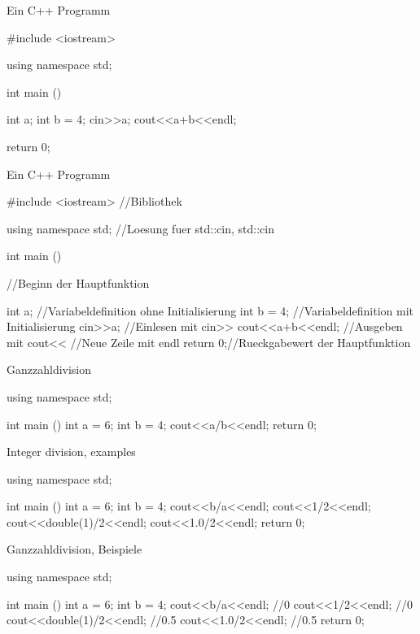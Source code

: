 \documentclass[handout,usenames,dvipsnames]{beamer}
\begin{document}
\begin{frame}[fragile]{Ein C++ Programm}
\begin{TFCpp}
#include <iostream>

using namespace std;

int main (){

	int a; 
	int b = 4;
	cin>>a;
	cout<<a+b<<endl;

	return 0;
}
\end{TFCpp}
\end{frame}

\begin{frame}[fragile]{Ein C++ Programm}
\begin{TFCpp}
#include <iostream> //Bibliothek

using namespace std; //Loesung fuer std::cin, std::cin

int main (){ //Beginn der Hauptfunktion

	int a; //Variabeldefinition ohne Initialisierung
	int b = 4; //Variabeldefinition mit Initialisierung
	cin>>a; //Einlesen mit cin>>
	cout<<a+b<<endl; //Ausgeben mit cout<<
	//Neue Zeile mit endl
	return 0;//Rueckgabewert der Hauptfunktion
}
\end{TFCpp}
\end{frame}

\begin{frame}[fragile]{Ganzzahldivision}

\begin{TFCpp}
using namespace std;

int main (){
	int a = 6;
	int b = 4;
	cout<<a/b<<endl;
	return 0;
}
\end{TFCpp}

\end{frame}

\begin{frame}[fragile]{Integer division, examples}

\begin{TFCpp}
using namespace std;

int main (){
	int a = 6;
	int b = 4;
	cout<<b/a<<endl;
	cout<<1/2<<endl;
	cout<<double(1)/2<<endl;
	cout<<1.0/2<<endl;
	return 0;
}
\end{TFCpp}
\end{frame}

\begin{frame}[fragile]{Ganzzahldivision, Beispiele}

\begin{TFCpp}
using namespace std;

int main (){
	int a = 6;
	int b = 4;
	cout<<b/a<<endl;	//0
	cout<<1/2<<endl;	//0
	cout<<double(1)/2<<endl;	//0.5
	cout<<1.0/2<<endl;	//0.5
	return 0;
}
\end{TFCpp}
\end{frame}
\end{document}
